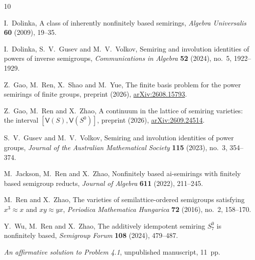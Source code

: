 \documentclass[11pt,reqno]{amsart}
\theoremstyle{definition}
\numberwithin{equation}{section}
\newcommand{\Var}{\mathsf{V}}
\begin{document}
\clearpage
\begin{thebibliography}{10}

I.~Dolinka,
A class of inherently nonfinitely based semirings,
\emph{Algebra Universalis} \textbf{60} (2009), 19--35.

I.~Dolinka, S.~V.~Gusev and M.~V.~Volkov,
Semiring and involution identities of powers of inverse semigroups,
\emph{Communications in Algebra} \textbf{52} (2024), no.~5, 1922--1929.

Z.~Gao, M.~Ren, X.~Shao and M.~Yue,
The finite basis problem for the power semirings of finite groups,
preprint (2026),
\href{https://arxiv.org/abs/2608.15793}{arXiv:2608.15793}.

Z.~Gao, M.~Ren and X.~Zhao,
A continuum in the lattice of semiring varieties: the interval $[\Var(S),\Var(S^0)]$,
preprint (2026),
\href{https://arxiv.org/abs/2609.24514}{arXiv:2609.24514}.

S.~V.~Gusev and M.~V.~Volkov,
Semiring and involution identities of power groups,
\emph{Journal of the Australian Mathematical Society} \textbf{115} (2023), no.~3, 354--374.

M.~Jackson, M.~Ren and X.~Zhao,
Nonfinitely based ai-semirings with finitely based semigroup reducts,
\emph{Journal of Algebra} \textbf{611} (2022), 211--245.

M.~Ren and X.~Zhao,
The varieties of semilattice-ordered semigroups satisfying $x^3\approx x$ and $xy\approx yx$,
\emph{Periodica Mathematica Hungarica} \textbf{72} (2016), no.~2, 158--170.

Y.~Wu, M.~Ren and X.~Zhao,
The additively idempotent semiring $S_7^0$ is nonfinitely based,
\emph{Semigroup Forum} \textbf{108} (2024), 479--487.

\emph{An affirmative solution to Problem 4.1},
unpublished manuscript, 11~pp.

\end{thebibliography}
\end{document}
